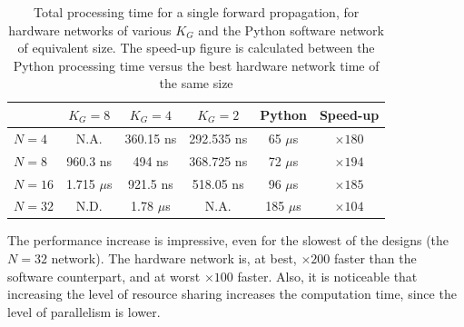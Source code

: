 \begin{table}
    \centering
    \begin{tabular}{ | l | c | c | c | c | c | }
    \hline
    & $K_G=8$  & $K_G=4$ & $K_G=2$ & Python & Speed-up \\ 
    \hline
    $N=4$ & N.A.  & 360.15 ns  & 292.535 ns & 65 $\mu$s & $\times180$ \\   
    \hline 
    $N=8$ & 960.3 ns  & 494 ns  &  368.725 ns & 72 $\mu$s & $\times194$ \\    
    \hline
    $N=16$ & 1.715 $\mu$s  & 921.5 ns  & 518.05 ns & 96 $\mu$s & $\times185$ \\
    \hline
    $N=32$ & N.D. & 1.78 $\mu$s  & N.A. & 185 $\mu$s  &  $\times104$ \\    
\hline
  \end{tabular}
    \caption{Total processing time for a single forward propagation, for hardware networks of various $K_G$ and the Python software network of equivalent size. The speed-up figure is calculated between the Python processing time versus the best hardware network time of the same size}
    \label{tab:process-time}
\end{table}
The performance increase is impressive, even for the slowest of the designs (the $N=32$ network). The hardware network is, at best, $\times200$ faster than the software counterpart, and at worst $\times100$ faster. Also, it is noticeable that increasing the level of resource sharing increases the computation time, since the level of parallelism is lower. 

